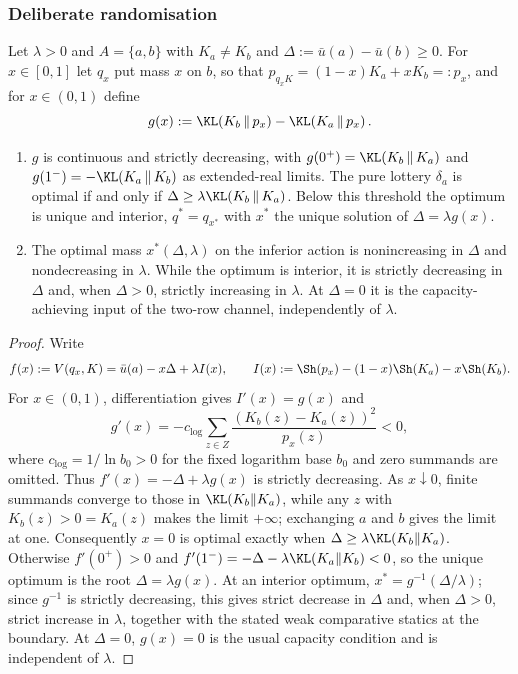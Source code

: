 \subsubsection{Deliberate randomisation}
\label{app:randomisation-proofs}

\begin{proposition}\label{prop:binary}
Let $\lambda>0$ and $A=\{a,b\}$ with $K_a\ne K_b$ and
$\Delta:=\bar u(a)-\bar u(b)\ge0$.  For $x\in[0,1]$ let $q_x$ put mass $x$ on $b$, so that
$p_{q_xK}=(1-x)K_a+xK_b=:p_x$, and for $x\in(0,1)$ define
\[
 g(x):=\KL\!\left(K_b\,\middle\|\,p_x\right)-\KL\!\left(K_a\,\middle\|\,p_x\right).
\]
\begin{enumerate}[label=\textup{(\roman*)},leftmargin=*]
\item $g$ is continuous and strictly decreasing, with
$g(0^+)=\KL(K_b\,\|\,K_a)$ and
$g(1^-)=-\KL(K_a\,\|\,K_b)$ as extended-real limits.  The pure lottery $\delta_a$ is optimal if and only if
$\Delta\ge\lambda\KL(K_b\,\|\,K_a)$.  Below this threshold the optimum is unique and interior,
$q^*=q_{x^*}$ with $x^*$ the unique solution of $\Delta=\lambda g(x)$.
\item The optimal mass $x^*(\Delta,\lambda)$ on the inferior action is nonincreasing in $\Delta$ and
nondecreasing in $\lambda$.  While the optimum is interior, it is strictly decreasing in $\Delta$ and,
when $\Delta>0$, strictly increasing in $\lambda$.  At $\Delta=0$ it is the capacity-achieving input
of the two-row channel, independently of $\lambda$.
\end{enumerate}
\end{proposition}

\begin{proof}
Write
\[
 f(x):=V(q_x,K)=\bar u(a)-x\Delta+\lambda I(x),
 \qquad
 I(x):=\Sh(p_x)-(1-x)\Sh(K_a)-x\Sh(K_b).
\]
For $x\in(0,1)$, differentiation gives $I'(x)=g(x)$ and
\[
 g'(x)
 =-c_{\log}\sum_{z\in Z}\frac{(K_b(z)-K_a(z))^2}{p_x(z)}<0,
\]
where $c_{\log}=1/\ln b_0>0$ for the fixed logarithm base $b_0$
and zero summands are omitted.  Thus $f'(x)=-\Delta+\lambda g(x)$ is strictly
decreasing.  As $x\downarrow0$, finite summands converge to those in
$\KL(K_b\|K_a)$, while any $z$ with $K_b(z)>0=K_a(z)$ makes the limit
$+\infty$; exchanging $a$ and $b$ gives the limit at one.  Consequently
$x=0$ is optimal exactly when
$\Delta\ge\lambda\KL(K_b\|K_a)$.  Otherwise $f'(0^+)>0$ and
$f'(1^-)=-\Delta-\lambda\KL(K_a\|K_b)<0$, so the unique optimum is the
root $\Delta=\lambda g(x)$.  At an interior optimum,
$x^*=g^{-1}(\Delta/\lambda)$; since $g^{-1}$ is strictly decreasing, this
gives strict decrease in $\Delta$ and, when $\Delta>0$, strict increase in
$\lambda$, together with the stated weak comparative statics at the boundary.
At $\Delta=0$, $g(x)=0$ is the usual capacity condition and is independent
of $\lambda$.
\end{proof}

